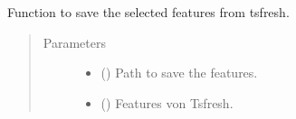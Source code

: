 \documentclass[letterpaper,10pt,english]{sphinxmanual}
\begin{document}
\begin{fulllineitems}
\label{\detokenize{anoog.io:anoog.io.data_io.save_features}}
\sphinxAtStartPar
Function to save the selected features from tsfresh.
\begin{quote}\begin{description}
\item[{Parameters}] \leavevmode\begin{itemize}
\item {} 
\sphinxAtStartPar
{} () \textendash{} Path to save the features.

\item {} 
\sphinxAtStartPar
{} () \textendash{} Features von Tsfresh.

\end{itemize}

\end{description}\end{quote}

\end{fulllineitems}

\end{document}
